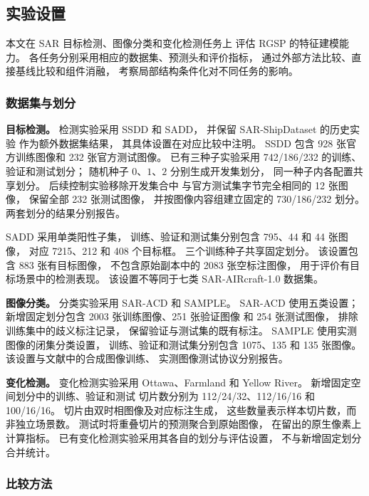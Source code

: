 \documentclass[journal]{IEEEtran}
\begin{document}
\subsection{实验设置}
\label{sec:experimental_settings}

本文在 SAR 目标检测、图像分类和变化检测任务上
评估 RGSP 的特征建模能力。
各任务分别采用相应的数据集、预测头和评价指标，
通过外部方法比较、直接基线比较和组件消融，
考察局部结构条件化对不同任务的影响。

\subsubsection{数据集与划分}
\label{sec:datasets}

\textbf{目标检测。}
检测实验采用 SSDD 和 SADD，
并保留 SAR-ShipDataset 的历史实验
作为额外数据集结果\cite{sardataset}，
其具体设置在对应比较中注明。
SSDD 包含 928 张官方训练图像和
232 张官方测试图像\cite{ssdd2017,ssdd2021}。
已有三种子实验采用
742/186/232 的训练、验证和测试划分；
随机种子 $0$、$1$、$2$ 分别生成开发集划分，
同一种子内各配置共享划分。
后续控制实验移除开发集合中
与官方测试集字节完全相同的 12 张图像，
保留全部 232 张测试图像，
并按图像内容组建立固定的
730/186/232 划分。
两套划分的结果分别报告。

SADD 采用单类阳性子集，
训练、验证和测试集分别包含
795、44 和 44 张图像，
对应 7215、212 和 408 个目标框。
三个训练种子共享固定划分。
该设置包含 883 张有目标图像，
不包含原始副本中的 2083 张空标注图像，
用于评价有目标场景中的检测表现。
该设置不等同于七类 SAR-AIRcraft-1.0 数据集\cite{saraircraft}。

\textbf{图像分类。}
分类实验采用 SAR-ACD 和 SAMPLE。
SAR-ACD 使用五类设置；
新增固定划分包含
2003 张训练图像、251 张验证图像
和 254 张测试图像，
排除训练集中的歧义标注记录，
保留验证与测试集的既有标注。
SAMPLE 使用实测图像的闭集分类设置，
训练、验证和测试集分别包含
1075、135 和 135 张图像。
该设置与文献中的合成图像训练、
实测图像测试协议分别报告。

\textbf{变化检测。}
变化检测实验采用 Ottawa、Farmland
和 Yellow River。
新增固定空间划分中的训练、验证和测试
切片数分别为
112/24/32、112/16/16 和 100/16/16。
切片由双时相图像及对应标注生成，
这些数量表示样本切片数，而非独立场景数。
测试时将重叠切片的预测聚合到原始图像，
在留出的原生像素上计算指标。
已有变化检测实验采用其各自的划分与评估设置，
不与新增固定划分合并统计。

\subsubsection{比较方法}
\label{sec:comparison_methods}
\end{document}
